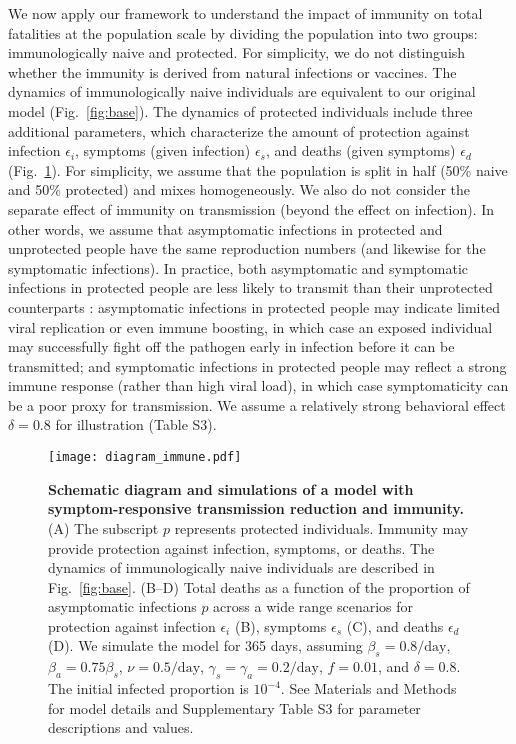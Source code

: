 \documentclass[12pt]{article}
\newcommand{\fref}[1]{Fig.~\ref{fig:#1}}
\begin{document}
We now apply our framework to understand the impact of immunity on total fatalities at the population scale by dividing the population into two groups: immunologically naive and protected.
For simplicity, we do not distinguish whether the immunity is derived from natural infections or vaccines.
The dynamics of immunologically naive individuals are equivalent to our original model (\fref{base}).
The dynamics of protected individuals include three additional parameters, which characterize the amount of protection against infection $\epsilon_i$, symptoms (given infection) $\epsilon_s$, and deaths (given symptoms) $\epsilon_d$ (\fref{immune}).
For simplicity, we assume that the population is split in half (50\% naive and 50\% protected) and mixes homogeneously. We also do not consider the separate effect of immunity on transmission (beyond the effect on infection). 
In other words, we assume that asymptomatic infections in protected and unprotected people have the same reproduction numbers (and likewise for the symptomatic infections).
In practice, both asymptomatic and symptomatic infections in protected people are less likely to transmit than their unprotected counterparts \cite{lipsitch2020understanding}: asymptomatic infections in protected people may indicate limited viral replication or even immune boosting, in which case an exposed individual may successfully fight off the pathogen early in infection before it can be transmitted; and symptomatic infections in protected people may reflect a strong immune response (rather than high viral load), in which case symptomaticity can be a poor proxy for transmission.
We assume a relatively strong behavioral effect $\delta=0.8$ for illustration (Table S3).

\begin{figure}[!ht]
\texttt{[image: diagram\_immune.pdf]}
\caption{
\textbf{Schematic diagram and simulations of a model with symptom-responsive transmission reduction and immunity.}
(A) The subscript $p$ represents protected individuals. 
Immunity may provide protection against infection, symptoms, or deaths.
The dynamics of immunologically naive individuals are described in \fref{base}.
(B--D) Total deaths as a function of the proportion of asymptomatic infections $p$ across a wide range scenarios for protection against infection $\epsilon_i$ (B), symptoms $\epsilon_s$ (C), and deaths $\epsilon_d$ (D).
We simulate the model for 365 days, assuming $\beta_s = 0.8/\mathrm{day}$, $\beta_a = 0.75 \beta_s$, $\nu=0.5/\mathrm{day}$, $\gamma_s=\gamma_a=0.2/\mathrm{day}$, $f=0.01$, and $\delta=0.8$.
The initial infected proportion is $10^{-4}$.
See Materials and Methods for model details and Supplementary Table S3 for parameter descriptions and values.
}
\label{fig:immune}
\end{figure}
\end{document}
